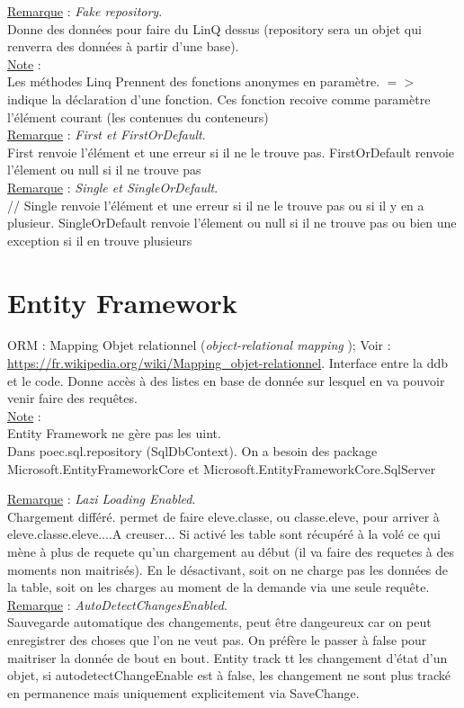 \documentclass[a4paper,12pt,twoside]{article}
\newcommand{\rem}[2]{\noindent\underline{Remarque} : \textit{#1}.\\ \indent #2}
\newcommand{\note}[1]{\noindent\underline{Note} : \\ \indent #1}
\begin{document}
\rem{Fake repository}{Donne des données pour faire du LinQ dessus (repository sera un objet qui renverra des données à partir d'une base).}\\

\note{Les méthodes Linq Prennent des fonctions anonymes en paramètre. $=>$ indique la déclaration d'une fonction. Ces fonction recoive comme paramètre l'élément courant (les contenues du conteneurs)}\\

\rem{First et FirstOrDefault}{First renvoie l'élément et une erreur si il ne le trouve pas. FirstOrDefault renvoie l'élement ou null si il ne trouve pas}\\

\rem{Single et SingleOrDefault}{// Single renvoie l'élément et une erreur si il ne le trouve pas ou si il y en a plusieur. SingleOrDefault renvoie l'élement ou null si il ne trouve pas ou bien une exception si il en trouve plusieurs}\\

\section{Entity Framework}

ORM  : Mapping Objet relationnel (\textit{object-relational mapping }); Voir : \url{https://fr.wikipedia.org/wiki/Mapping_objet-relationnel}. Interface entre la ddb et le code.
Donne accès à des listes en base de donnée sur lesquel en va pouvoir venir faire des requêtes.\\

\note{Entity Framework ne gère pas les uint.}\\

Dans poec.sql.repository (SqlDbContext). On a besoin des package Microsoft.EntityFrameworkCore et Microsoft.EntityFrameworkCore.SqlServer

\rem{Lazi Loading Enabled}{Chargement différé. permet de faire eleve.classe, ou classe.eleve, pour arriver à eleve.classe.eleve....A creuser... Si activé les table sont récupéré à la volé ce qui mène à plus de requete qu'un chargement au début (il va faire des requetes à des moments non maitrisés). En le désactivant, soit on ne charge pas les données de la table, soit on les charges au moment de la demande via une seule requête.}\\

\rem{AutoDetectChangesEnabled}{Sauvegarde automatique des changements, peut être dangeureux car on peut enregistrer des choses que l'on ne veut pas. On préfère le passer à false pour maitriser la donnée de bout en bout. Entity track tt les changement d'état d'un objet, si autodetectChangeEnable est à false, les changement ne sont plus tracké en permanence mais uniquement explicitement via SaveChange.}\\
\end{document}
